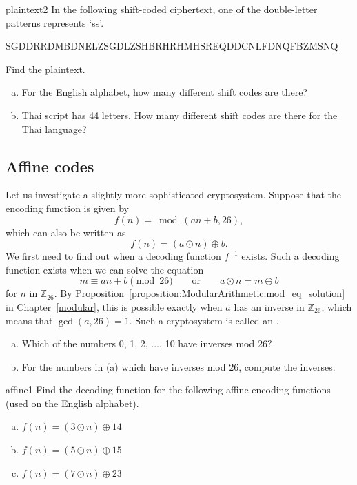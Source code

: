 \begin{exercise}{plaintext2}  
In the following shift-coded ciphertext,  one of the double-letter patterns represents `ss'. 

SGDDRRDMBDNELZSGDLZSHBRHRHMHSREQDDCNLFDNQFBZMSNQ

\noindent
Find the plaintext.
\end{exercise}

\begin{exercise}{}  
\begin{enumerate}[(a)]
\item
For the English alphabet, how many different shift codes are there?
\item
Thai script has 44 letters. How many different shift codes are there for the Thai language?
\end{enumerate}
\end{exercise}


\subsection{Affine codes}
 
Let us investigate a slightly more sophisticated cryptosystem. Suppose
that the encoding function is given by  
$$
f(n) = \bmod(an + b,  26),
$$
which can also be written as
$$
f(n) = (a \odot n) \oplus b.
$$
We first need to find out when a decoding function $f^{-1}$ exists.
Such a decoding function exists when we can solve the equation
$$
m \equiv an + b \pmod{26}\qquad \textrm{or}\qquad a \odot n = m \ominus  b
$$
for $n$ in $\mathbb{Z}_{26}$. By Proposition~\ref{proposition:ModularArithmetic:mod_eq_solution} in Chapter~\ref{modular}, this is possible exactly when $a$ has an
inverse in $\mathbb{Z}_{26}$, which means that $\gcd( a, 26) =1$. 
Such a cryptosystem is called an . 
 
\begin{exercise}{}
\begin{enumerate}[(a)]
\item
Which of the numbers 0, 1, 2, $\dots$, 10 have inverses mod 26?
\item
For the numbers in (a) which have inverses mod 26, compute the inverses.
\end{enumerate}
\end{exercise}


\begin{exercise}{affine1}
Find the decoding function for the following  affine encoding functions (used on the English alphabet).
\begin{enumerate}[(a)]
\item
$f(n)=(3 \odot n) \oplus 14$
\item
$f(n)=(5 \odot n) \oplus 15$
\item
$f(n)=(7 \odot n) \oplus 23$
\end{enumerate}
\end{exercise}

